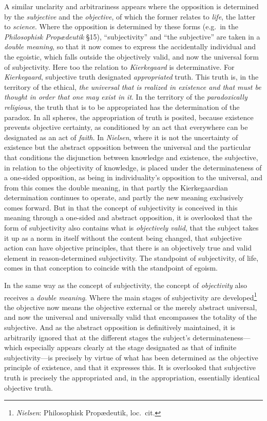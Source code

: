 \documentclass[12pt,a4paper]{book}
\begin{document}
A similar unclarity and arbitrariness appears where the opposition is
determined by the \emph{subjective} and the \emph{objective}, of which the former
relates to \emph{life}, the latter to \emph{science}. Where the opposition is
determined by these forms (e.g.\ in the \emph{Philosophisk
Prop\ae deutik} \S15), ``subjectivity'' and ``the subjective'' are taken in
a \emph{double meaning}, so that it now comes to express the accidentally
individual and the egoistic, which falls outside the objectively valid,
and now the universal form of subjectivity. Here too the relation to
\emph{Kierkegaard} is determinative. For \emph{Kierkegaard}, subjective truth
designated \emph{appropriated} truth. This truth is, in the territory of the
ethical, \emph{the universal that is realized in existence and that must be
thought in order that one may exist in it}. In the territory of the
\emph{paradoxically religious}, the truth that is to be appropriated has the
determination of the paradox. In all spheres, the appropriation of truth
is posited, because existence prevents objective certainty, as
conditioned by an act that everywhere can be designated as an act of
\emph{faith}. In \emph{Nielsen}, where it is not the uncertainty of existence but the
abstract opposition between the universal and the particular that
conditions the disjunction between knowledge and existence, the
subjective, in relation to the objectivity of knowledge, is placed
under the determinateness of a one-sided opposition, as being in
individuality's opposition to the universal, and from this comes the
double meaning, in that partly the Kierkegaardian determination
continues to operate, and partly the new meaning exclusively comes
forward. But in that the concept of subjectivity is conceived in this
meaning through a one-sided and abstract opposition, it is overlooked
that the form of subjectivity also contains what is \emph{objectively valid},
that the subject takes it up as a norm in itself without the content
being changed, that subjective action can have objective principles,
that there is an objectively true and valid element in
reason-determined subjectivity. The standpoint of subjectivity, of life,
comes in that conception to coincide with the standpoint of egoism.

In the same way as the concept of subjectivity, the concept of
\emph{objectivity} also receives a \emph{double meaning}. Where the main stages of
subjectivity are developed\footnote{\emph{Nielsen}: Philosophisk Prop\ae deutik, loc.\ cit.} the objective now means the objective external or
the merely abstract universal, and now the universal and universally
valid that encompasses the totality of the subjective. And as the
abstract opposition is definitively maintained, it is arbitrarily
ignored that at the different stages the subject's determinateness---
which especially appears clearly at the stage designated as that of
infinite subjectivity---is precisely by virtue of what has been
determined as the objective principle of existence, and that it
expresses this. It is overlooked that subjective truth is precisely the
appropriated and, in the appropriation, essentially identical objective
truth.
\end{document}
